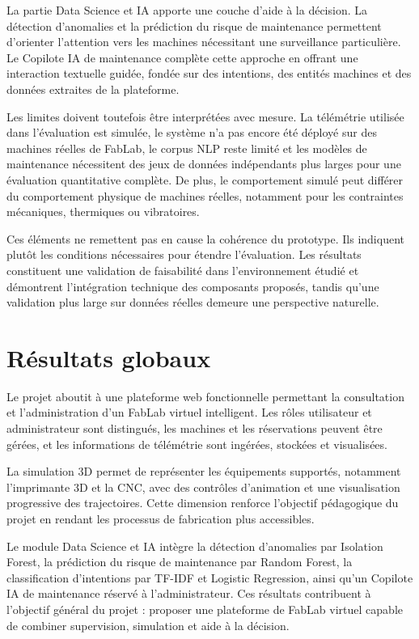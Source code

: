 La partie Data Science et IA apporte une couche d'aide à la décision. La détection d'anomalies et la prédiction du risque de maintenance permettent d'orienter l'attention vers les machines nécessitant une surveillance particulière. Le Copilote IA de maintenance complète cette approche en offrant une interaction textuelle guidée, fondée sur des intentions, des entités machines et des données extraites de la plateforme.

Les limites doivent toutefois être interprétées avec mesure. La télémétrie utilisée dans l'évaluation est simulée, le système n'a pas encore été déployé sur des machines réelles de FabLab, le corpus NLP reste limité et les modèles de maintenance nécessitent des jeux de données indépendants plus larges pour une évaluation quantitative complète. De plus, le comportement simulé peut différer du comportement physique de machines réelles, notamment pour les contraintes mécaniques, thermiques ou vibratoires.

Ces éléments ne remettent pas en cause la cohérence du prototype. Ils indiquent plutôt les conditions nécessaires pour étendre l'évaluation. Les résultats constituent une validation de faisabilité dans l'environnement étudié et démontrent l'intégration technique des composants proposés, tandis qu'une validation plus large sur données réelles demeure une perspective naturelle.

\section{Résultats globaux}

Le projet aboutit à une plateforme web fonctionnelle permettant la consultation et l'administration d'un FabLab virtuel intelligent. Les rôles utilisateur et administrateur sont distingués, les machines et les réservations peuvent être gérées, et les informations de télémétrie sont ingérées, stockées et visualisées.

La simulation 3D permet de représenter les équipements supportés, notamment l'imprimante 3D et la CNC, avec des contrôles d'animation et une visualisation progressive des trajectoires. Cette dimension renforce l'objectif pédagogique du projet en rendant les processus de fabrication plus accessibles.

Le module Data Science et IA intègre la détection d'anomalies par Isolation Forest, la prédiction du risque de maintenance par Random Forest, la classification d'intentions par TF-IDF et Logistic Regression, ainsi qu'un Copilote IA de maintenance réservé à l'administrateur. Ces résultats contribuent à l'objectif général du projet : proposer une plateforme de FabLab virtuel capable de combiner supervision, simulation et aide à la décision.

